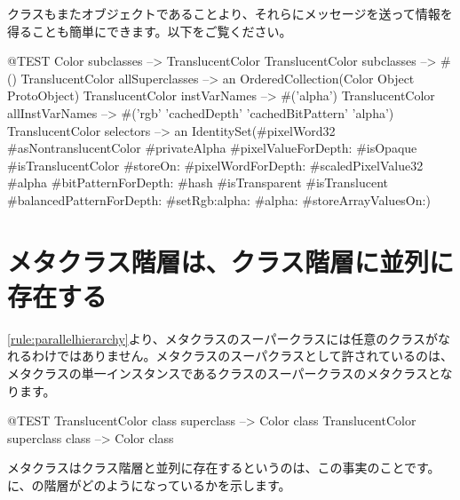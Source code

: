 \documentclass[a4paper,10pt,twoside]{book}
\begin{document}
クラスもまたオブジェクトであることより、それらにメッセージを送って情報を得ることも簡単にできます。以下をご覧ください。

\begin{code}{@TEST}
Color subclasses                           --> {TranslucentColor}
TranslucentColor subclasses         --> #()
TranslucentColor allSuperclasses  --> an OrderedCollection(Color Object ProtoObject)
TranslucentColor instVarNames     --> #('alpha')
TranslucentColor allInstVarNames --> #('rgb' 'cachedDepth' 'cachedBitPattern' 'alpha')
TranslucentColor selectors             -->  an IdentitySet(#pixelWord32 #asNontranslucentColor #privateAlpha #pixelValueForDepth: #isOpaque #isTranslucentColor #storeOn: #pixelWordForDepth: #scaledPixelValue32 #alpha #bitPatternForDepth: #hash #isTransparent #isTranslucent #balancedPatternForDepth: #setRgb:alpha: #alpha: #storeArrayValuesOn:)
\end{code}

\section{メタクラス階層は、クラス階層に並列に存在する}

\ref{rule:parallelhierarchy}より、メタクラスのスーパークラスには任意のクラスがなれるわけではありません。メタクラスのスーパクラスとして許されているのは、メタクラスの単一インスタンスであるクラスのスーパークラスのメタクラスとなります。

\begin{code}{@TEST}
TranslucentColor class superclass --> Color class
TranslucentColor superclass class --> Color class
\end{code}

\noindent
メタクラスはクラス階層と並列に存在するというのは、この事実のことです。に、の階層がどのようになっているかを示します。
\end{document}
